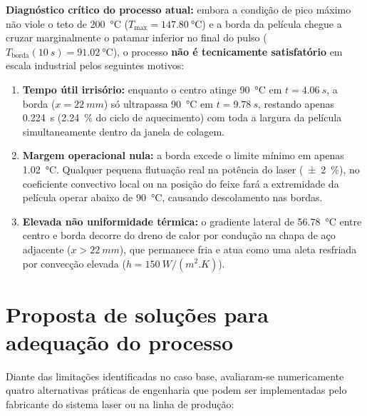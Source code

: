 \documentclass[11pt,a4paper]{article}
\begin{document}
\textbf{Diagnóstico crítico do processo atual:} embora a condição de pico máximo não viole o teto de \SI{200}{\celsius} ($T_{\max} = \SI{147,80}{\celsius}$) e a borda da película chegue a cruzar marginalmente o patamar inferior no final do pulso ($T_{\text{borda}}(\SI{10}{s}) = \SI{91,02}{\celsius}$), o processo \textbf{não é tecnicamente satisfatório} em escala industrial pelos seguintes motivos:
\begin{enumerate}
    \item \textbf{Tempo útil irrisório:} enquanto o centro atinge \SI{90}{\celsius} em $t = \SI{4,06}{s}$, a borda ($x = \SI{22}{mm}$) só ultrapassa \SI{90}{\celsius} em $t = \SI{9,78}{s}$, restando apenas \SI{0,224}{s} (\SI{2,24}{\percent} do ciclo de aquecimento) com toda a largura da película simultaneamente dentro da janela de colagem.
    \item \textbf{Margem operacional nula:} a borda excede o limite mínimo em apenas \SI{1,02}{\celsius}. Qualquer pequena flutuação real na potência do laser (\SI{+-2}{\percent}), no coeficiente convectivo local ou na posição do feixe fará a extremidade da película operar abaixo de \SI{90}{\celsius}, causando descolamento nas bordas.
    \item \textbf{Elevada não uniformidade térmica:} o gradiente lateral de \SI{56,78}{\celsius} entre centro e borda decorre do dreno de calor por condução na chapa de aço adjacente ($x > \SI{22}{mm}$), que permanece fria e atua como uma aleta resfriada por convecção elevada ($h = \SI{150}{W/(m^2.K)}$).
\end{enumerate}

\section{Proposta de soluções para adequação do processo}

Diante das limitações identificadas no caso base, avaliaram-se numericamente quatro alternativas práticas de engenharia que podem ser implementadas pelo fabricante do sistema laser ou na linha de produção:
\end{document}
